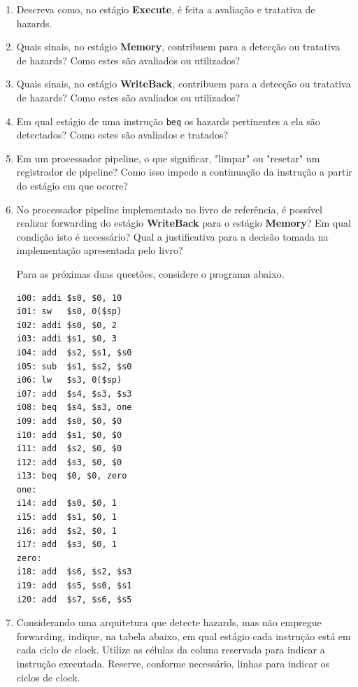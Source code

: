 \documentclass{article}
\begin{document}
\begin{enumerate}
\item Descreva como, no estágio \textbf{Execute}, é feita a avaliação e tratativa de hazards.

\item Quais sinais, no estágio \textbf{Memory}, contribuem para a detecção ou tratativa de hazards? Como estes são avaliados ou utilizados?

\item Quais sinais, no estágio \textbf{WriteBack}, contribuem para a detecção ou tratativa de hazards? Como estes são avaliados ou utilizados?

\item Em qual estágio de uma instrução \verb|beq| os hazards pertinentes a ela são detectados? Como estes são avaliados e tratados?

\item Em um processador pipeline, o que significar, "limpar" ou "resetar" um registrador de pipeline? Como isso impede a continuação da instrução a partir do estágio em que ocorre?

\item No processador pipeline implementado no livro de referência, é possível realizar forwarding do estágio \textbf{WriteBack} para o estágio \textbf{Memory}? Em qual condição isto é necessário? Qual a justificativa para a decisão tomada na implementação apresentada pelo livro?

Para as próximas duas questões, considere o programa abaixo.

\begin{center}
    \begin{minipage}{0.35\textwidth}
        \begin{lstlisting}[frame=single]
i00: addi $s0, $0, 10
i01: sw   $s0, 0($sp)
i02: addi $s0, $0, 2
i03: addi $s1, $0, 3
i04: add  $s2, $s1, $s0
i05: sub  $s1, $s2, $s0
i06: lw   $s3, 0($sp)
i07: add  $s4, $s3, $s3
i08: beq  $s4, $s3, one
i09: add  $s0, $0, $0
i10: add  $s1, $0, $0
i11: add  $s2, $0, $0
i12: add  $s3, $0, $0
i13: beq  $0, $0, zero
one:
i14: add  $s0, $0, 1
i15: add  $s1, $0, 1
i16: add  $s2, $0, 1
i17: add  $s3, $0, 1
zero:
i18: add  $s6, $s2, $s3
i19: add  $s5, $s0, $s1
i20: add  $s7, $s6, $s5
        \end{lstlisting}
    \end{minipage}
\end{center}

\pagebreak

\item Considerando uma arquitetura que detecte hazards, mas não empregue forwarding, indique, na tabela abaixo, em qual estágio cada instrução está em cada ciclo de clock. Utilize as células da coluna reservada para indicar a instrução executada. Reserve, conforme necessário, linhas para indicar os ciclos de clock.


\end{enumerate}
\end{document}
